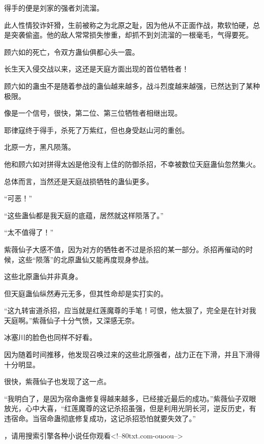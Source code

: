 \begin{this_body}
得手的便是刘家的强者刘流溜。

此人性情狡诈奸猾，生前被称之为北原之耻，因为他从不正面作战，欺软怕硬，总是突袭偷盗。他的敌人常常损失惨重，却抓不到刘流溜的一根毫毛，气得要死。

顾六如的死亡，令双方蛊仙俱都心头一震。

长生天入侵交战以来，这还是天庭方面出现的首位牺牲者！

顾六如的蛊虫不是随着参战的蛊仙越来越多，战斗烈度越来越强，已然达到了某种极限。

像是一个信号，很快，第二位、第三位牺牲者相继出现。

耶律寇终于得手，杀死了万紫红，但也身受赵山河的重创。

北原一方，黑凡陨落。

他和顾六如对拼得太凶是他没有上佳的防御杀招，不幸被数位天庭蛊仙忽然集火。

总体而言，当然还是天庭战损牺牲的蛊仙更多。

“可恶！”

“这些蛊仙都是我天庭的底蕴，居然就这样陨落了。”

“太不值得了！”

紫薇仙子大感不值，因为对方的牺牲者不过是杀招的某一部分。杀招再催动的时候，这些“陨落”的北原蛊仙又能再度现身参战。

这些北原蛊仙并非真身。

但天庭蛊仙纵然寿元无多，但其性命却是实打实的。

“这九转宙道杀招，应当就是红莲魔尊的手笔！可恨，他太狠了，完全是在针对我天庭啊。”紫薇仙子十分气愤，又深感无奈。

冰塞川的脸色也同样不好看。

因为随着时间推移，他发现召唤过来的这些北原强者，战力正在下滑，并且下滑得十分明显。

很快，紫薇仙子也发现了这一点。

“我明白了，是因为宿命蛊修复得越来越多，已经接近最后的成功。”紫薇仙子双眼放光，心中大喜，“红莲魔尊的这记杀招虽强，但是利用光阴长河，逆反历史，有违宿命。当宿命蛊彻底修复成功，这记杀招恐怕就要失效了。”

，请用搜索引擎各种小说任你观看<!--80txt.com-ouoou-->

\end{this_body}

